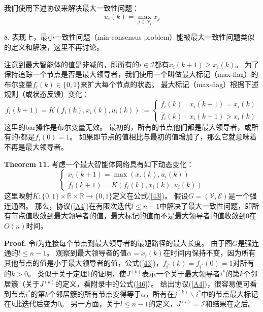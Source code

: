 \documentclass{article}
\begin{document}
我们使用下述协议来解决最大一致性问题：
\begin{equation}
    \tag{A4}
    \label{A4}
    u_i(k) = \max_{j\in N_i}x_j
\end{equation}

 8. 表现上，最小一致性问题（min-consensus problem）能被最大一致性问题类似的定义和解决，这里不再讨论。

注意到最大智能体的值是非减的，即所有的$i\in\mathcal{I}$都有$x_i(k+1)\ge x_i(k)$。
为了保持追踪一个节点是否是最大领导者，我们使用一个叫做最大标记（max-flag）的布尔变量$f_i(k)\in\{0,1\}$来扩大每个节点的状态。
最大标记（max-flag）根据下述规则（或状态反馈）变化：
\begin{equation}
    \tag{43}
    \label{43}
    f_i(k+1) = K(f_i(k),x_i(k),u_i(k)):=
    \left\{
        \begin{matrix}
            f_i(k)\quad x_i(k+1)=x_i(k)\\
            \bar{f}_i(k) \quad x_i(k+1)>x_i(k)
        \end{matrix}
    \right.
\end{equation}
这里的bar操作是布尔变量无效。
最初的，所有的节点他们都是最大领导者，或所有的$i$都是$f_i(0)=1$。
如果即节点的值相比与最初的值增加了，那么它就意味着不再是最大领导者。

\noindent\textbf{Theorem 11.} 考虑一个最大智能体网络具有如下动态变化：
\begin{equation}
    \tag{44}
    \label{44}
    \left\{
        \begin{matrix}
            x_i(k+1) = \max(x_i(k),u_i(k))\\
            f_i(k+1) = K(f_i(k),x_i(k),u_i(k))
        \end{matrix}
    \right.
\end{equation}
这里映射$K:\{0,1\}\times \mathbb{R}\times\mathbb{R}\rightarrow\{0,1\}$定义在公式(\ref{43})。
假设$G=(\mathcal{V},\mathcal{E})$是一个强连通图。
那么，协议(\ref{A4})在有限次迭代$l\le n-1$中解决了最大一致性问题，即所有节点值收敛到最大领导者的值，最大标记的值而不是最大领导者的值收敛到0在$O(n)$时间。

\noindent\textbf{Proof.} 令$l$为连接每个节点到最大领导者的最短路径的最大长度。
由于图$G$是强连通的$l\le n-1$。
观察到最大领导者的值$\alpha=x_i(k)$在时间内保持不变，因为所有其他节点的值是小于最大领导者的值，公式(\ref{43})，$f_{i^*}(k)=f_{i^*}(0)=1$对所有的$k>0$。
类似于关于定理1的证明，使$J^{(k)}$表示一个关于最大领导者$i^*$的第$k$个邻居簇（关于$J^{(k)}$的定义，看附录中的公式(\ref{46}）。
给出协议(\ref{A4})，很容易便可看到节点$i^*$的第$k$个邻居簇的所有节点变得等于$\alpha$，所有在$j^{(k)}\backslash {i^*}$中的节点最大标记在$k$此迭代后变为0。
另一方面，关于$l\le n-1$的定义，$J^{(l)}=\mathcal{I}$和结果在之后。
\end{document}
